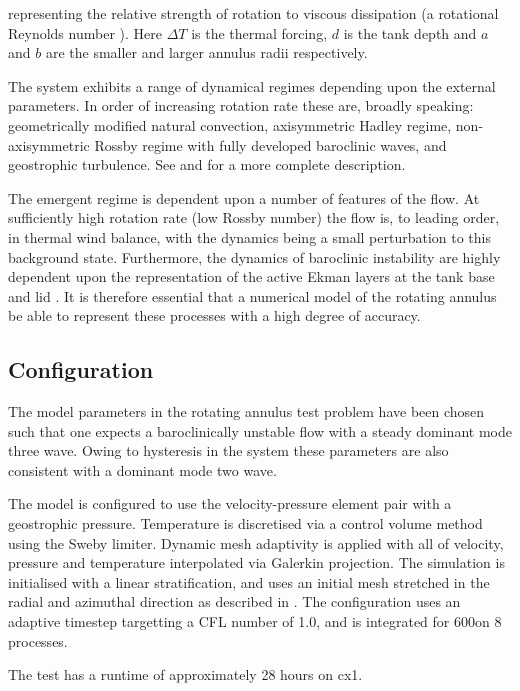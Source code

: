 representing the relative strength of rotation to viscous dissipation (a rotational
Reynolds number \citep{lorenz1967}). Here $\Delta T$ is the thermal forcing, $d$ is the tank depth and $a$ and $b$
are the smaller and larger annulus radii respectively.

The system exhibits a range of dynamical regimes depending upon the external parameters.
In order of increasing rotation
rate these are, broadly speaking: geometrically modified natural convection,
axisymmetric Hadley regime, non-axisymmetric Rossby regime with fully developed
baroclinic waves, and geostrophic turbulence. See \citet{hide1975} and \citet{frueh1997}
for a more complete description.

The emergent regime is dependent upon a number of features of the flow. At
sufficiently high rotation rate (low Rossby number) the flow is, to leading
order, in thermal wind balance, with the dynamics being a small perturbation to
this background state. Furthermore, the dynamics of baroclinic instability are
highly dependent upon the representation of the active Ekman layers at the tank
base and lid \citep{hide1969}. It is therefore essential that a numerical model
of the rotating annulus be able to represent these processes with a high degree
of accuracy.

\subsection{Configuration}

The model parameters in the rotating annulus test problem have been chosen such
that one expects a baroclinically unstable flow with a steady dominant mode three
wave. Owing to hysteresis in the system these parameters are also consistent with
a dominant mode two wave.

The model is configured to use the \Poo velocity-pressure element pair with a \Ptwo
geostrophic pressure. Temperature is discretised via a control volume method using
the Sweby limiter. Dynamic mesh adaptivity is applied with all of velocity, pressure
and temperature interpolated via Galerkin projection. The simulation is initialised
with a linear stratification, and uses an initial mesh stretched in
the radial and azimuthal direction as described in \citet{farnell1975}. The
configuration uses an adaptive timestep targetting a CFL number of 1.0, and is
integrated for 600\s[] on 8 processes.

The test has a runtime of approximately 28 hours on cx1.

